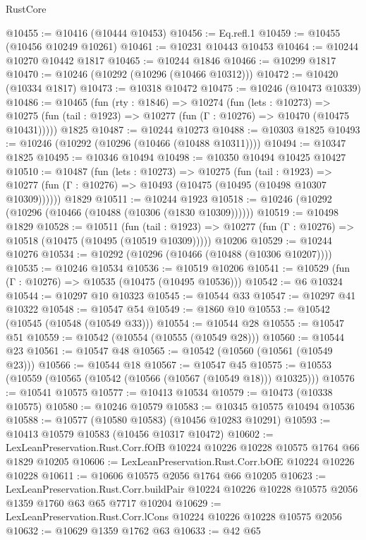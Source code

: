 \begin{lexlean}{RustCore}
\begin{coremodule}
@10455 := @10416 (@10444 @10453)
@10456 := Eq.refl.{1}
@10459 := @10455 (@10456 @10249 @10261)
@10461 := @10231 @10443 @10453
@10464 := @10244 @10270 @10442 @1817
@10465 := @10244 @1846
@10466 := @10299 @1817
@10470 := @10246 (@10292 (@10296 (@10466 @10312)))
@10472 := @10420 (@10334 @1817)
@10473 := @10318 @10472
@10475 := @10246 (@10473 @10339)
@10486 := @10465
    (fun (rty : @1846) =>
    @10274
      (fun (lets : @10273) =>
      @10275 (fun (tail : @1923) => @10277 (fun (Γ : @10276) => @10470 (@10475 @10431)))))
    @1825
@10487 := @10244 @10273
@10488 := @10303 @1825
@10493 := @10246 (@10292 (@10296 (@10466 (@10488 @10311))))
@10494 := @10347 @1825
@10495 := @10346 @10494
@10498 := @10350 @10494 @10425 @10427
@10510 := @10487
    (fun (lets : @10273) =>
    @10275
      (fun (tail : @1923) =>
      @10277 (fun (Γ : @10276) => @10493 (@10475 (@10495 (@10498 @10307 @10309))))))
    @1829
@10511 := @10244 @1923
@10518 := @10246 (@10292 (@10296 (@10466 (@10488 (@10306 (@1830 @10309))))))
@10519 := @10498 @1829
@10528 := @10511
    (fun (tail : @1923) => @10277 (fun (Γ : @10276) => @10518 (@10475 (@10495 (@10519 @10309)))))
    @10206
@10529 := @10244 @10276
@10534 := @10292 (@10296 (@10466 (@10488 (@10306 @10207))))
@10535 := @10246 @10534
@10536 := @10519 @10206
@10541 := @10529 (fun (Γ : @10276) => @10535 (@10475 (@10495 @10536)))
@10542 := @6 @10324
@10544 := @10297 @10 @10323
@10545 := @10544 @33
@10547 := @10297 @41 @10322
@10548 := @10547 @54
@10549 := @1860 @10
@10553 := @10542 (@10545 (@10548 (@10549 @33)))
@10554 := @10544 @28
@10555 := @10547 @51
@10559 := @10542 (@10554 (@10555 (@10549 @28)))
@10560 := @10544 @23
@10561 := @10547 @48
@10565 := @10542 (@10560 (@10561 (@10549 @23)))
@10566 := @10544 @18
@10567 := @10547 @45
@10575 := @10553 (@10559 (@10565 (@10542 (@10566 (@10567 (@10549 @18))) @10325)))
@10576 := @10541 @10575
@10577 := @10413 @10534
@10579 := @10473 (@10338 @10575)
@10580 := @10246 @10579
@10583 := @10345 @10575 @10494 @10536
@10588 := @10577 (@10580 @10583) (@10456 @10283 @10291)
@10593 := @10413 @10579 @10583 (@10456 @10317 @10472)
@10602 := LexLeanPreservation.Rust.Corr.fOfB @10224 @10226 @10228 @10575 @1764 @66 @1829 @10205
@10606 := LexLeanPreservation.Rust.Corr.bOfE @10224 @10226 @10228
@10611 := @10606 @10575 @2056 @1764 @66 @10205
@10623 := LexLeanPreservation.Rust.Corr.buildPair
    @10224
    @10226
    @10228
    @10575
    @2056
    @1359
    @1760
    @63
    @65
    @7717
    @10204
@10629 := LexLeanPreservation.Rust.Corr.lCons @10224 @10226 @10228 @10575 @2056
@10632 := @10629 @1359 @1762 @63
@10633 := @42 @65

\end{coremodule}
\end{lexlean}
